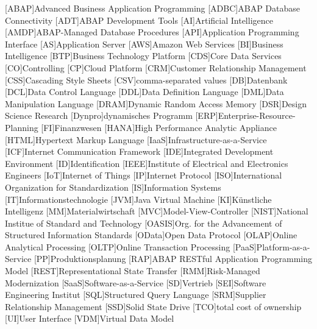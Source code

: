 

	\begin{acronym}[XXXXXXX]
		{Advanced Business Application Programming}
		{ABAP Database Connectivity}
		[ADT]{ABAP Development Tools}
		[AI]{Artificial Intelligence}
		{ABAP-Managed Database Procedures}
		[API]{Application Programming Interface}
		[AS]{Application Server}
		[AWS]{Amazon Web Services}
		[BI]{Business Intelligence}
		[BTP]{Business Technology Platform}
		[CDS]{Core Data Services}
		[CO]{Controlling}
		[CP]{Cloud Platform}
		[CRM]{Customer Relationship Management}
		[CSS]{Cascading Style Sheets}
		[CSV]{comma-separated values}
		[DB]{Datenbank}
		[DCL]{Data Control Language}
		[DDL]{Data Definition Language}
		[DML]{Data Manipulation Language}
		{Dynamic Random Access Memory}
		[DSR]{Design Science Research}
		[Dynpro]{dynamisches Programm}
		[ERP]{Enterprise-Resource-Planning}
		[FI]{Finanzwesen}
		{High Performance Analytic Appliance}
		{Hypertext Markup Language}
		{Infrastructure-as-a-Service}
		[ICF]{Internet Communication Framework}
		[IDE]{Integrated Development Environment}
		[ID]{Identification}
		{Institute of Electrical and Electronics Engineers}
		[IoT]{Internet of Things}
		[IP]{Internet Protocol}
		[ISO]{International Organization for Standardization}
		[IS]{Information Systems}
		[IT]{Informationstechnologie}
		[JVM]{Java Virtual Machine}
		[KI]{Künstliche Intelligenz}
		[MM]{Materialwirtschaft}
		[MVC]{Model-View-Controller}
		{National Institue of Standard and Technology}
		[OASIS]{Org. for the Advancement of Structured Information Standards}
		[OData]{Open Data Protocol}
		{Online Analytical Processing}
		{Online Transaction Processing}
		{Platform-as-a-Service}
		[PP]{Produktionsplanung}
		[RAP]{ABAP RESTful Application Programming Model}
		{Representational State Transfer}
		[RMM]{Risk-Managed Modernization}
		{Software-as-a-Service}
		[SD]{Vertrieb}
		[SEI]{Software Engineering Institut}
		[SQL]{Structured Query Language}
		[SRM]{Supplier Relationship Management}
		[SSD]{Solid State Drive}
		[TCO]{total cost of ownership}
		[UI]{User Interface}
		[VDM]{Virtual Data Model}


\end{acronym}

